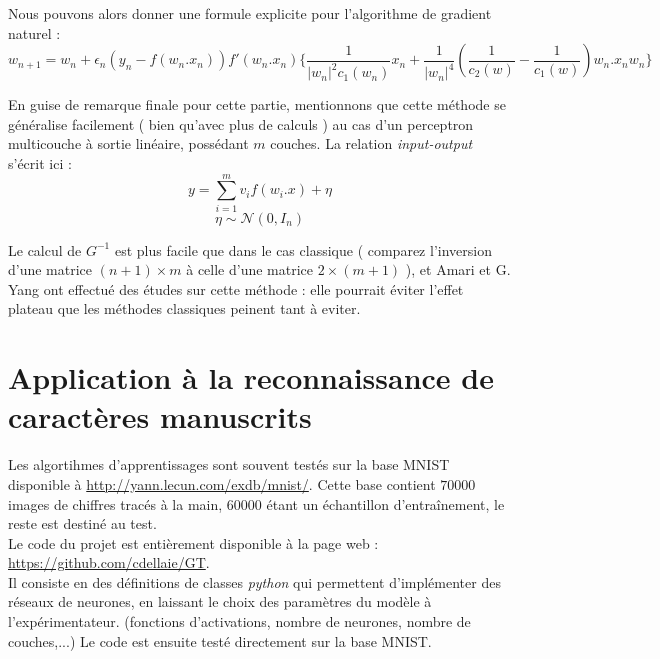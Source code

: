 \documentclass{article}
\theoremstyle{definition}
\begin{document}
Nous pouvons alors donner une formule explicite pour l'algorithme de gradient naturel :
\[w_{n+1}=w_n + \epsilon_n(y_n-f(w_n.x_n))f'(w_n.x_n)
	\{ \frac{1}{|w_n|^2c_1(w_n)}x_n+\frac{1}{|w_n|^4}( \frac{1}{c_2(w)}-\frac{1}{c_1(w)}) w_n.x_n w_n\}\]

En guise de remarque finale pour cette partie, mentionnons que cette méthode se généralise facilement ( bien qu'avec plus de calculs ) au cas d'un perceptron multicouche à sortie linéaire, possédant $m$ couches. 
La relation \textit{input-output} s'écrit ici :
\[y=\sum_{i=1}^m v_i f(w_i.x)+\eta\]
\[\eta \sim \mathcal N(0,I_n)\]

Le calcul de $G^{-1}$ est plus facile que dans le cas classique ( comparez l'inversion d'une matrice $(n+1)\times m$ à celle d'une matrice $2 \times (m+1)$ ), et Amari et G. Yang ont effectué des études sur cette méthode : elle pourrait éviter l'effet plateau que les méthodes classiques peinent tant à eviter.

\section{Application à la reconnaissance de caractères manuscrits}

Les algortihmes d'apprentissages sont souvent testés sur la base MNIST disponible à \url{http://yann.lecun.com/exdb/mnist/}. Cette base contient $70 000$ images de chiffres tracés à la main, $60 000$ étant un échantillon d'entraînement, le reste est destiné au test. \\

Le code du projet est entièrement disponible à la page web : \url{https://github.com/cdellaie/GT}.\\

Il consiste en des définitions de classes \textit{python} qui permettent d'implémenter des réseaux de neurones, en laissant le choix des paramètres du modèle à l'expérimentateur. (fonctions d'activations, nombre de neurones, nombre de couches,...) Le code est ensuite testé directement sur la base MNIST.

\end{document}
